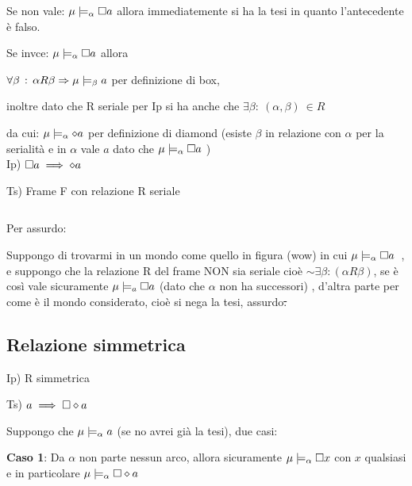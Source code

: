 Se non vale: $\mu\models_{\alpha}\square a$ allora immediatemente si
ha la tesi in quanto l'antecedente è falso.

Se invce: $\mu\models_{\alpha}\square a$ allora

$\forall\beta\,:\,\alpha R\beta\Rightarrow\mu\models_{\beta}a$ per definizione
di box,

inoltre dato che R seriale per Ip si ha anche che $\exists\beta:\:(\alpha,\beta)\:\in R$

da cui: $\mu\models_{\alpha}\diamond a$ per definizione di diamond (esiste
$\beta$ in relazione con $\alpha$ per la serialità e in $\alpha$
vale $a$ dato che $\mu\models_{\alpha}\square a$ )\\


Ip) $\square a\implies\diamond a$

Ts) Frame F con relazione R seriale

\begin{center}
$ $\begin{center}  
 \end{center}
\par\end{center}

Per assurdo:

Suppongo di trovarmi in un mondo come quello in figura (wow) in cui
\mbox{$\mu\models_{\alpha}\square a$ }, e suppongo che la relazione
R del frame NON sia seriale cioè $\sim\exists\beta:(\alpha R\beta)$,
se è così vale sicuramente $\mu\models_{a}\square a$ (dato che $\alpha$
non ha successori) , d'altra parte per come è il mondo considerato,
cioè si nega la tesi, assurdo\sout{.}


\subsection{Relazione simmetrica}

Ip) R simmetrica

Ts) $a\implies\square\diamond a$

Suppongo che $\mu\models_{\alpha}a$ (se no avrei già la tesi), due
casi:

\textbf{Caso 1}: Da $\alpha$ non parte nessun arco, allora sicuramente
$\mu\models_{\alpha}\square x$ con $x$ qualsiasi e in particolare
$\mu\models_{\alpha}\square\diamond a$

